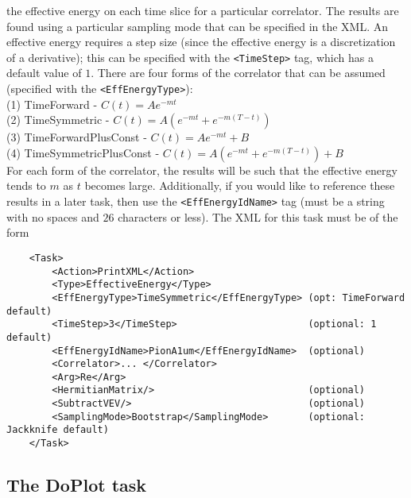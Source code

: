 \documentclass[12pt,notitlepage,letterpaper]{article}
\newcommand{\vb}{\texttt}
\begin{document}
\begin{description}
the effective energy on each time slice for a
particular correlator. The results are found using a particular sampling mode
that can be specified in the XML.
An effective energy requires a step size (since the effective energy
is a discretization of a derivative); this can be specified with
the \vb{<TimeStep>} tag, which has a default value of $1$.
There are four forms of the correlator that
can be assumed (specified with the \vb{<EffEnergyType>}): \\
\hspace*{15pt} (1) TimeForward - $C(t) = A e^{-m t}$ \\
\hspace*{15pt} (2) TimeSymmetric - $C(t) = A ( e^{-m t} + e^{-m (T-t)})$ \\
\hspace*{15pt} (3) TimeForwardPlusConst - $C(t) = A e^{-m t} + B$ \\
\hspace*{15pt} (4) TimeSymmetricPlusConst - $C(t) = A ( e^{-m t} + e^{-m (T-t)}) + B$ \\
For each form of the correlator, the results will be such that
the effective energy tends to $m$ as $t$ becomes large.
Additionally, if you would like to reference these results in a later task, then
use the \vb{<EffEnergyIdName>} tag (must be a string with no spaces and $26$ characters
or less). The XML for this task must be of the form
\begin{verbatim}
    <Task>
        <Action>PrintXML</Action>
        <Type>EffectiveEnergy</Type>
        <EffEnergyType>TimeSymmetric</EffEnergyType> (opt: TimeForward default)
        <TimeStep>3</TimeStep>                       (optional: 1 default)
        <EffEnergyIdName>PionA1um</EffEnergyIdName>  (optional)
        <Correlator>... </Correlator> 
        <Arg>Re</Arg>
        <HermitianMatrix/>                           (optional)
        <SubtractVEV/>                               (optional)
        <SamplingMode>Bootstrap</SamplingMode>       (optional: Jackknife default)
    </Task>   
\end{verbatim}
\end{description}

\subsection{The DoPlot task}
\end{document}
